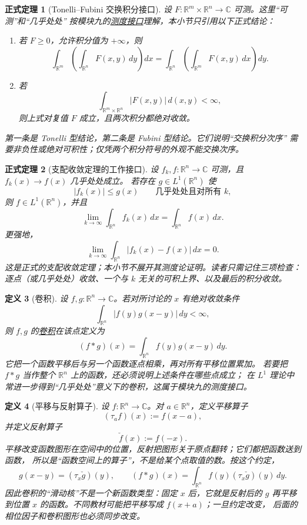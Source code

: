 \documentclass[UTF8,fontset=none,a4paper,11pt]{ctexart}
\theoremstyle{foundation-definition}
\newtheorem{definition}{定义}[section]
\theoremstyle{foundation-theorem}
\newtheorem{theorem}[definition]{正式定理}
\theoremstyle{foundation-proposition}
\theoremstyle{foundation-example}
\theoremstyle{foundation-remark}
\theoremstyle{foundation-theorem}
\newcommand{\term}[2]{\hyperref[#1]{#2}}
\begin{document}
\begin{theorem}[Tonelli--Fubini 交换积分接口]\label{thm:tonelli-fubini-interface}
设 \(F:\mathbb R^m\times\mathbb R^n\to\mathbb C\) 可测。这里“可测”和“几乎处处”
按模块九的\term{def:measurable}{测度接口}理解，本小节只引用以下正式结论：
\begin{enumerate}[label=(\roman*),leftmargin=2.5em]
  \item 若 \(F\geq0\)，允许积分值为 \(+\infty\)，则
  \[
  \int_{\mathbb R^m}\!\left(\int_{\mathbb R^n}F(x,y)\,dy\right)dx
  =
  \int_{\mathbb R^n}\!\left(\int_{\mathbb R^m}F(x,y)\,dx\right)dy.
  \]
  \item 若
  \[
  \int_{\mathbb R^m\times\mathbb R^n}|F(x,y)|\,d(x,y)<\infty,
  \]
  则上式对复值 \(F\) 成立，且两次积分都绝对收敛。
\end{enumerate}
第一条是 Tonelli 型结论，第二条是 Fubini 型结论。它们说明“交换积分次序”
需要非负性或绝对可积性；仅凭两个积分符号的外观不能交换次序。
\end{theorem}

\begin{theorem}[支配收敛定理的工作接口]\label{thm:dominated-convergence-interface}
设 \(f_k,f:\mathbb R^n\to\mathbb C\) 可测，且 \(f_k(x)\to f(x)\) 几乎处处成立。
若存在 \(g\in L^1(\mathbb R^n)\) 使
\[
|f_k(x)|\leq g(x)\qquad\text{几乎处处且对所有 }k,
\]
则 \(f\in L^1(\mathbb R^n)\)，并且
\[
\lim_{k\to\infty}\int_{\mathbb R^n}f_k(x)\,dx
=\int_{\mathbb R^n}f(x)\,dx.
\]
更强地，
\[
\lim_{k\to\infty}\int_{\mathbb R^n}|f_k(x)-f(x)|\,dx=0.
\]
这是正式的支配收敛定理；本小节不展开其测度论证明。读者只需记住三项检查：
逐点（或几乎处处）收敛、一个与 \(k\) 无关的可积上界、以及最后的积分收敛。
\end{theorem}

\begin{definition}[卷积]\label{def:convolution}
设 \(f,g:\mathbb R^n\to\mathbb C\)。若对所讨论的 \(x\) 有绝对收敛条件
\[
  \int_{\mathbb R^n}|f(y)g(x-y)|\,dy<\infty,
\]
则 \(f,g\) 的\term{def:convolution}{卷积}在该点定义为
\[
(f*g)(x)=\int_{\mathbb R^n}f(y)g(x-y)\,dy.
\]
它把一个函数平移后与另一个函数逐点相乘，再对所有平移位置累加。
若要把 \(f*g\) 当作整个 \(\mathbb R^n\) 上的函数，还必须说明上述条件在哪些点成立；
在 \(L^1\) 理论中常进一步得到“几乎处处”意义下的卷积，这属于模块九的测度接口。
\end{definition}

\begin{definition}[平移与反射算子]\label{def:translation-reflection}
设 \(f:\mathbb R^n\to\mathbb C\)。对 \(a\in\mathbb R^n\)，定义平移算子
\[
(\tau_a f)(x):=f(x-a),
\]
并定义反射算子
\[
\check f(x):=f(-x).
\]
平移改变函数图形在空间中的位置，反射把图形关于原点翻转；它们都把函数送到函数，
所以是“函数空间上的算子”，不是给某个点取值的数。按这个约定，
\[
g(x-y)=(\tau_x\check g)(y),
\qquad
(f*g)(x)=\int_{\mathbb R^n}f(y)(\tau_x\check g)(y)\,dy.
\]
因此卷积的“滑动核”不是一个新函数类型：固定 \(x\) 后，它就是反射后的 \(g\)
再平移到位置 \(x\) 的函数。不同教材可能把平移写成 \(f(x+a)\)；一旦约定改变，
后面的相位因子和卷积图形也必须同步改变。
\end{definition}
\end{document}

